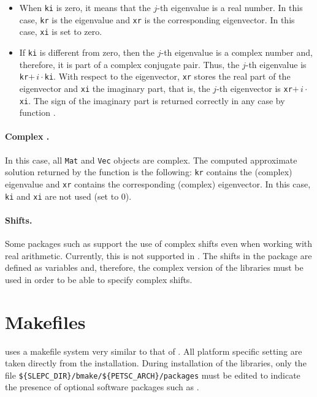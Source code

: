 \begin{itemize}
\item	When \texttt{ki} is zero, it means that the $j$-th eigenvalue is a real number. In this case, \texttt{kr} is the eigenvalue and \texttt{xr} is the corresponding eigenvector. In this case, \texttt{xi} is set to zero.

\item	If \texttt{ki} is different from zero, then the $j$-th eigenvalue is a complex number and, therefore, it is part of a complex conjugate pair. Thus, the $j$-th eigenvalue is \texttt{kr}$+\,i\cdot$\texttt{ki}.
With respect to the eigenvector, \texttt{xr} stores the real part of the eigenvector and \texttt{xi} the imaginary part, that is, the $j$-th eigenvector is \texttt{xr}$+\,i\cdot$\texttt{xi}. The sign of the imaginary part is returned correctly in any case by function .
\end{itemize}

\paragraph{Complex \slepc.} In this case, all \texttt{Mat} and \texttt{Vec} objects are complex. The computed approximate solution returned by the function  is the following: \texttt{kr} contains the (complex) eigenvalue and \texttt{xr} contains the corresponding (complex) eigenvector. In this case, \texttt{ki} and \texttt{xi} are not used (set to 0).

\paragraph{Shifts.} Some packages such as \arpack{} support the use of complex shifts even when working with real arithmetic. Currently, this is not supported in \slepc. The shifts in the  package are defined as  variables and, therefore, the complex version of the libraries must be used in order to be able to specify complex shifts.

\section{Makefiles}

	\slepc uses a makefile system very similar to that of \petsc. All platform specific setting are taken directly from the \petsc{} installation. During installation of the \slepc libraries, only the file \Verb!${SLEPC_DIR}/bmake/${PETSC_ARCH}/packages! must be edited to indicate the presence of optional software packages such as \arpack.

